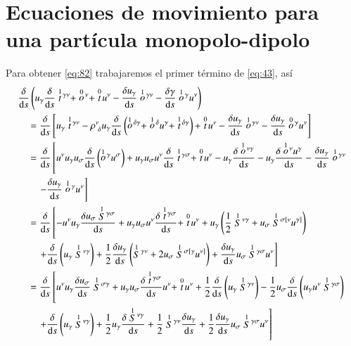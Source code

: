 \chapter{Ecuaciones de movimiento para una partícula monopolo-dipolo}
\label{ape:2}

Para obtener \eqref{eq:82} trabajaremos el primer t\'ermino de \eqref{eq:43}, as\'i
\begin{align}
& \cd{} \left( u_{\gamma} \cd{} \des{1}{t}^{\gamma \nu} + \des{0}{o}^{\nu} + \des{0}{t} u^{\nu} - \cd{u_{\gamma}} \des{1}{o}^{\gamma \nu} - \cd{\gamma} \des{1}{o}^{\gamma}u^{\nu} \right) \nonumber\\
&\quad = \cd{} \left[ u_{\gamma} \des{1}{t}^{\gamma \nu} -  \rho^{\nu}_{\ \delta} u_{\gamma} \cd{} \left( \des{1}{o}^{\delta \gamma} + \des{1}{o}^{\delta} u^{\gamma} + \des{1}{t}^{\delta \gamma} \right) + \des{0}{t} u^{\nu} - \cd{u_{\gamma}} \des{1}{o}^{\gamma \nu} -  \cd{u_{\gamma}} \des{0}{o}^{\gamma} u^{\nu} \right] \nonumber \\
&\quad = \cd{}  \left[ u^{\nu} u_{\gamma} u_{\sigma} \cd{} \left( \des{1}{o}^{\gamma} u^{\sigma} \right) + u_{\gamma} u_{\sigma} u^{\nu} \cd{} \des{1}{t}^{\gamma \sigma} + \des{0}{t} u^{\nu} - u_{\gamma} \cd{\des{1}{o}^{\nu \gamma}} - u_{\gamma} \cd{\des{1}{o}^{\nu} u^{\gamma}} - \cd{u_{\gamma}} \des{1}{o}^{\gamma \nu} \right. \nonumber \\
&\qquad \left. - \cd{u_{\gamma}} \des{1}{o}^{\gamma} u^{\nu} \right] \nonumber \\
&\quad = \cd{}  \left[  -u^{\nu} u_{\gamma} \cd{u_{\sigma} \des{1}{S}^{\gamma \sigma}} + u_{\gamma} u_{\sigma} u^{\nu} \cd{\des{1}{t}^{\gamma \sigma}} + \des{0}{t} u^{\nu} + u_{\gamma} \left(  \frac{1}{2} \des{1}{S}^{\nu \gamma} + u_{\sigma} \des{1}{S}^{\sigma [\nu} u^{\gamma]} \right) \right. \nonumber \\
&\qquad \left. + \cd{} \left( u_{\gamma} \des{1}{S}^{\nu \gamma} \right) + \frac{1}{2} \cd{u_{\gamma}} \left( \des{1}{S}^{\gamma \nu} + 2u_{\sigma} \des{1}{S}^{\sigma [\gamma} u^{\nu]} \right) + \cd{u_{\gamma}} u_{\sigma} \des{1}{S}^{\gamma \sigma} u^{\nu} \right] \nonumber\\
&\quad = \cd{} \left[ u^{\nu} u_{\gamma} \cd{u_{\sigma}} \des{1}{S}^{\sigma \gamma} + u_{\gamma} u_{\sigma} \cd{\des{1}{t}^{\gamma \sigma}} u^{\nu} + \des{0}{t} u^{\nu} + \frac{1}{2} \cd{} \left(       u_{\gamma} \des{1}{S}^{\gamma \nu} \right) - \frac{1}{2} u_{\sigma} \cd{} \left( u_{\gamma} u^{\nu} \des{1}{S}^{\gamma \sigma} \right) \right. \nonumber \\
&\qquad \left. + \cd{}\left( u_{\gamma} \des{1}{S}^{\nu \gamma} \right) + \frac{1}{2} u_{\gamma} \cd{\des{1}{S}^{\nu \gamma}} + \frac{1}{2} \des{1}{S}^{\gamma \nu} \cd{u_{\gamma}} + \frac{1}{2} \cd{u_{\gamma}} u_{\sigma} \des{1}{S}^{\gamma \sigma} u^{\nu} \right] \nonumber
\end{align}
\newpage

